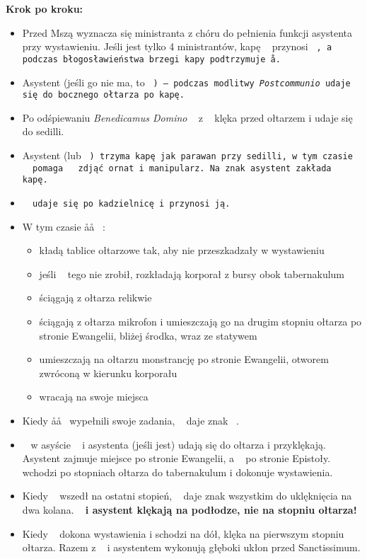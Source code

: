 		\textbf{Krok po kroku:}
		\begin{itemize}
			\item Przed Mszą wyznacza się ministranta z chóru do pełnienia funkcji asystenta przy wystawieniu. Jeśli jest tylko 4 ministrantów, kapę \ii~ przynosi \tt~, a podczas błogosławieństwa brzegi kapy podtrzymuje \aa.
			\item Asystent (jeśli go nie ma, to \tt~) – podczas modlitwy \textit{Postcommunio} udaje się do bocznego ołtarza po kapę.
			\item Po odśpiewaniu \textit{Benedicamus Domino} \ii~ z \cc~ klęka przed ołtarzem i udaje się do sedilli.
			\item Asystent (lub \tt~) trzyma kapę jak parawan przy sedilli, w tym czasie \cc~ pomaga \ii~ zdjąć ornat i manipularz. Na znak \cc asystent zakłada \ii~ kapę.
			\item \tt~ udaje się po kadzielnicę i przynosi ją.
			\item W tym czasie \aa\aa~ :
			\begin{itemize}
				\item kładą tablice ołtarzowe tak, aby nie przeszkadzały w wystawieniu
				\item jeśli \ii~ tego nie zrobił, rozkładają korporał z bursy obok tabernakulum
				\item ściągają z ołtarza relikwie
				\item ściągają z ołtarza mikrofon i umieszczają go na drugim stopniu ołtarza po stronie Ewangelii, bliżej środka, wraz ze statywem
				\item umieszczają na ołtarzu monstrancję po stronie Ewangelii, otworem zwróconą w kierunku korporału
				\item wracają na swoje miejsca
			\end{itemize}
			\item Kiedy \aa\aa~ wypełnili swoje zadania, \cc~ daje znak \ii~.
			\item \ii~ w asyście \cc~ i asystenta (jeśli jest) udają się do ołtarza i przyklękają. Asystent zajmuje miejsce po stronie Ewangelii, a \cc~ po stronie Epistoły. \ii~ wchodzi po stopniach ołtarza do tabernakulum i dokonuje wystawienia.
			\item Kiedy \ii~ wszedł na ostatni stopień, \cc~ daje znak wszystkim do uklęknięcia na dwa kolana.
			{\boldmath{\cc}}~\textbf{ i asystent klękają na podłodze, nie na stopniu ołtarza!}
			\item  Kiedy \ii~ dokona wystawienia i schodzi na dół, klęka na pierwszym stopniu ołtarza. Razem z \cc~ i asystentem wykonują głęboki ukłon przed Sanctissimum.

\end{itemize}
